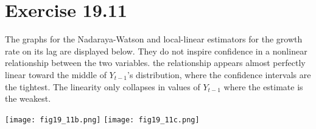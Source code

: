 \documentclass{article}
\begin{document}

\section*{Exercise 19.11}
The graphs for the Nadaraya-Watson and local-linear estimators for the growth rate on its lag are displayed below. They do not inspire confidence in a nonlinear relationship between the two variables. the relationship appears almost perfectly linear toward the middle of $Y_{t-1}$'s distribution, where the confidence intervals are the tightest. The linearity only collapses in values of $Y_{t-1}$ where the estimate is the weakest.
\begin{center}
	\texttt{[image: fig19\_11b.png]}
	\texttt{[image: fig19\_11c.png]}
\end{center}


\end{document}
